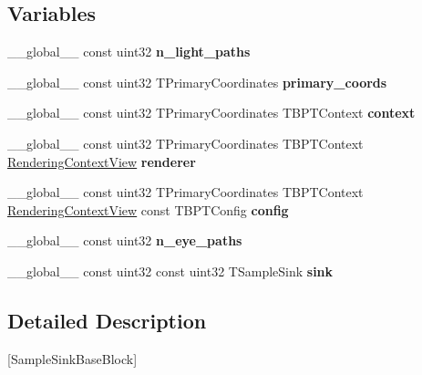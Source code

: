 \subsection*{Variables}
\begin{DoxyCompactItemize}
\item 
\+\_\+\+\_\+global\+\_\+\+\_\+ const uint32 {\bfseries n\+\_\+light\+\_\+paths}
\item 
\+\_\+\+\_\+global\+\_\+\+\_\+ const uint32 T\+Primary\+Coordinates {\bfseries primary\+\_\+coords}
\item 
\+\_\+\+\_\+global\+\_\+\+\_\+ const uint32 T\+Primary\+Coordinates T\+B\+P\+T\+Context {\bfseries context}
\item 
\+\_\+\+\_\+global\+\_\+\+\_\+ const uint32 T\+Primary\+Coordinates T\+B\+P\+T\+Context \hyperlink{struct_rendering_context_view}{Rendering\+Context\+View} {\bfseries renderer}
\item 
\+\_\+\+\_\+global\+\_\+\+\_\+ const uint32 T\+Primary\+Coordinates T\+B\+P\+T\+Context \hyperlink{struct_rendering_context_view}{Rendering\+Context\+View} const T\+B\+P\+T\+Config {\bfseries config}
\item 
\+\_\+\+\_\+global\+\_\+\+\_\+ const uint32 {\bfseries n\+\_\+eye\+\_\+paths}
\item 
\+\_\+\+\_\+global\+\_\+\+\_\+ const uint32 const uint32 T\+Sample\+Sink {\bfseries sink}
\end{DoxyCompactItemize}


\subsection{Detailed Description}
\mbox{[}Sample\+Sink\+Base\+Block\mbox{]} 